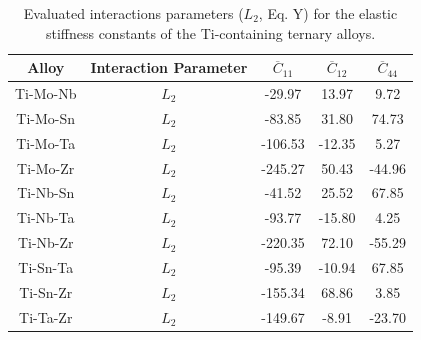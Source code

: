 \newpage
\begin{table}[H]
	\caption{Evaluated interactions parameters ($L_2$, Eq. Y) for the elastic stiffness constants of the Ti-containing ternary alloys.}
	\centering
	\begin{tabular}{ c c c c c }
		\hline
		Alloy & Interaction Parameter & $\overline{C}_{11}$ & $\overline{C}_{12}$ & $\overline{C}_{44}$\\
		\hline
		Ti-Mo-Nb & $L_2$ & -29.97 & 13.97 & 9.72\\
		Ti-Mo-Sn & $L_2$ & -83.85 & 31.80 & 74.73\\
		Ti-Mo-Ta & $L_2$ & -106.53 & -12.35 & 5.27\\
		Ti-Mo-Zr & $L_2$ & -245.27 & 50.43 & -44.96\\
		Ti-Nb-Sn & $L_2$ & -41.52 & 25.52 & 67.85\\
		Ti-Nb-Ta & $L_2$ & -93.77 & -15.80 & 4.25\\
		Ti-Nb-Zr & $L_2$ & -220.35 & 72.10 & -55.29\\
		Ti-Sn-Ta & $L_2$ & -95.39 & -10.94 & 67.85\\
		Ti-Sn-Zr & $L_2$ &  -155.34 & 68.86 & 3.85\\
		Ti-Ta-Zr & $L_2$ & -149.67 & -8.91 & -23.70\\		
		\hline
	\end{tabular}
	\label{Ch6-table:tixyelasip}
\end{table}
\clearpage


